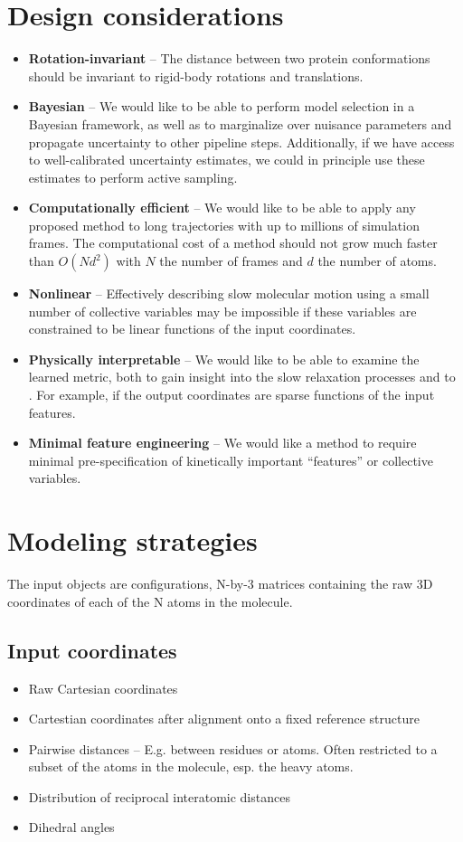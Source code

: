\documentclass[aps,prl,preprint,nofootinbib,superscriptaddress,linenumbers]{revtex4-1}
\newcommand{\bemph}[1]{\textbf{#1}}
\begin{document}
\section{Design considerations}
\begin{itemize}
 	 \item \bemph{Rotation-invariant} -- The distance between two protein conformations should be invariant to rigid-body rotations and translations.
	\item \bemph{Bayesian} -- We would like to be able to perform model selection in a Bayesian framework, as well as to marginalize over nuisance parameters and propagate uncertainty to other pipeline steps. Additionally, if we have access to well-calibrated uncertainty estimates, we could in principle use these estimates to perform active sampling.
 	\item \bemph{Computationally efficient} -- We would like to be able to apply any proposed method to long trajectories with up to millions of simulation frames. The computational cost of a method should not grow much faster than $O(Nd^2)$ with $N$ the number of frames and $d$ the number of atoms.
	 \item \bemph{Nonlinear} -- Effectively describing slow molecular motion using a small number of collective variables may be impossible if these variables are constrained to be linear functions of the input coordinates.
	 \item \bemph{Physically interpretable} -- We would like to be able to examine the learned metric, both to gain insight into the slow relaxation processes and to . For example, if the output coordinates are sparse functions of the input features.
	 \item \bemph{Minimal feature engineering} -- We would like a method to require minimal pre-specification of kinetically important ``features'' or collective variables.
\end{itemize}


\section{Modeling strategies}
The input objects are configurations, N-by-3 matrices containing the raw 3D coordinates of each of the N atoms in the molecule.

\subsection{Input coordinates}
\begin{itemize}
	\item Raw Cartesian coordinates
	\item Cartestian coordinates after alignment onto a fixed reference structure
	\item Pairwise distances -- E.g. between residues or atoms. Often restricted to a subset of the atoms in the molecule, esp. the heavy atoms.
	\item Distribution of reciprocal interatomic distances
	\item Dihedral angles
\end{itemize}
\end{document}
